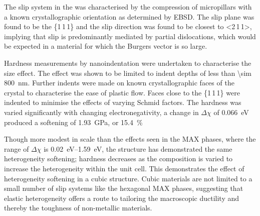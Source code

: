 The slip system in the  was characterised by the compression of micropillars with a known crystallographic orientation as determined by EBSD. The slip plane was found to be the \{1\,1\,1\} and the slip direction was found to be closest to <2\,1\,1>, implying that slip is predominantly mediated by partial dislocations, which would be expected in a material for which the Burgers vector is so large.

Hardness measurements by nanoindentation were undertaken to characterise the size effect. The effect was shown to be limited to indent depths of less than \SI{\sim 800}{\nano\meter}. Further indents were made on known crystallographic faces of the crystal to characterise the ease of plastic flow. Faces close to the \{1\,1\,1\} were indented to minimise the effects of varying Schmid factors. The hardness was varied significantly with changing electronegativity, a change in $\Delta \chi$ of \SI{0.066}{\electronvolt} produced a softening of \SI{1.93}{\giga\pascal}, or \SI{15.4}{\percent} 

Though more modest in scale than the effects seen in the MAX phases, where the range of $\Delta \chi$ is \SIrange{0.02}{1.59}{\electronvolt}, the  structure has demonstrated the same heterogeneity softening; hardness decreases as the composition is varied to increase the heterogeneity within the unit cell. This demonstrates the effect of heterogeneity softening in a cubic structure. Cubic materials are not limited to a small number of slip systems like the hexagonal MAX phases, suggesting that elastic heterogeneity offers a route to tailoring the  macroscopic ductility and thereby the toughness of non-metallic materials.
















































